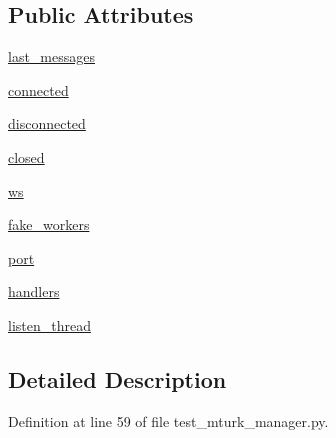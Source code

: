 \subsection*{Public Attributes}
\begin{DoxyCompactItemize}
\item 
\hyperlink{classparlai_1_1mturk_1_1core_1_1dev_1_1test_1_1test__mturk__manager_1_1MockSocket_a071360994ff2988486822c93d0aa8d45}{last\+\_\+messages}
\item 
\hyperlink{classparlai_1_1mturk_1_1core_1_1dev_1_1test_1_1test__mturk__manager_1_1MockSocket_a063ee6be1d754d77b8b0c2bea6ee09f4}{connected}
\item 
\hyperlink{classparlai_1_1mturk_1_1core_1_1dev_1_1test_1_1test__mturk__manager_1_1MockSocket_a87f2bc5626d08a98228c05fbdfd6fa08}{disconnected}
\item 
\hyperlink{classparlai_1_1mturk_1_1core_1_1dev_1_1test_1_1test__mturk__manager_1_1MockSocket_a78e99069984ec0340a693cf84b17350a}{closed}
\item 
\hyperlink{classparlai_1_1mturk_1_1core_1_1dev_1_1test_1_1test__mturk__manager_1_1MockSocket_a63fa2799d0ca98ebc656a6105247e65a}{ws}
\item 
\hyperlink{classparlai_1_1mturk_1_1core_1_1dev_1_1test_1_1test__mturk__manager_1_1MockSocket_a2b016c10307bd2c8d17d2f4e28b1b08f}{fake\+\_\+workers}
\item 
\hyperlink{classparlai_1_1mturk_1_1core_1_1dev_1_1test_1_1test__mturk__manager_1_1MockSocket_a60d22702272d9cb480a62ce9522778fc}{port}
\item 
\hyperlink{classparlai_1_1mturk_1_1core_1_1dev_1_1test_1_1test__mturk__manager_1_1MockSocket_ae3b381c54959b16b42c198eb27aeef06}{handlers}
\item 
\hyperlink{classparlai_1_1mturk_1_1core_1_1dev_1_1test_1_1test__mturk__manager_1_1MockSocket_a389e6749dd0517aeeab02ba8135a50ae}{listen\+\_\+thread}
\end{DoxyCompactItemize}


\subsection{Detailed Description}


Definition at line 59 of file test\+\_\+mturk\+\_\+manager.\+py.



